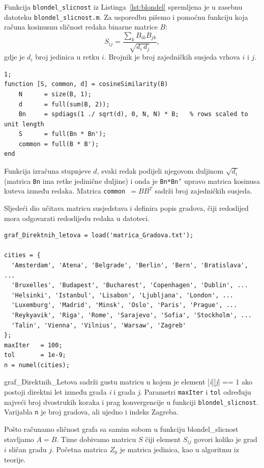 \documentclass[12pt, letterpaper]{article}
\numberwithin{figure}{section}
\begin{document}
Funkcija \texttt{blondel\_slicnost} iz Listinga~\ref{lst:blondel} spremljena je u zasebnu datoteku \texttt{blondel\_slicnost.m}. Za usporedbu pišemo i pomoćnu funkciju koja računa kosinusnu sličnost redaka binarne matrice $B$:
\[
S_{ij} = \frac{\sum_k B_{ik}B_{jk}}{\sqrt{d_i\, d_j}},
\]
gdje je $d_i$ broj jedinica u retku $i$. Brojnik je broj zajedničkih susjeda vrhova $i$ i $j$.

\begin{lstlisting}[style=octave, caption={Pomoćna funkcija za kosinusnu sličnost}, label={lst:cos_gradovi}]
1;
function [S, common, d] = cosineSimilarity(B)
    N      = size(B, 1);
    d      = full(sum(B, 2));
    Bn     = spdiags(1 ./ sqrt(d), 0, N, N) * B;   % rows scaled to unit length
    S      = full(Bn * Bn');
    common = full(B * B');
end
\end{lstlisting}
Funkcija izračuna stupnjeve $d$, svaki redak podijeli njegovom duljinom $\sqrt{d_i}$ (matrica \texttt{Bn} ima retke jedinične duljine) i onda je \texttt{Bn*Bn'} upravo matrica kosinusa kuteva između redaka. Matrica \texttt{common} \,$= BB^T$ sadrži broj zajedničkih susjeda.

Sljedeći dio učitava matricu susjedstava i definira popis gradova, čiji redoslijed mora odgovarati redoslijedu redaka u datoteci.

\begin{lstlisting}[style=octave, caption={Učitavanje grafa direktnih letova}, label={lst:gradovi_ucitavanje}]
graf_Direktnih_letova = load('matrica_Gradova.txt');

cities = {
  'Amsterdam', 'Atena', 'Belgrade', 'Berlin', 'Bern', 'Bratislava', ...
  'Bruxelles', 'Budapest', 'Bucharest', 'Copenhagen', 'Dublin', ...
  'Helsinki', 'Istanbul', 'Lisabon', 'Ljubljana', 'London', ...
  'Luxemburg', 'Madrid', 'Minsk', 'Oslo', 'Paris', 'Prague', ...
  'Reykyavik', 'Riga', 'Rome', 'Sarajevo', 'Sofia', 'Stockholm', ...
  'Talin', 'Vienna', 'Vilnius', 'Warsaw', 'Zagreb'
};
maxIter   = 100;
tol       = 1e-9;
n = numel(cities);
\end{lstlisting}
graf\_Direktnih\_Letova sadrži gustu matricu u kojem je element [\textit{i}][\textit{j}] == 1 ako postoji direktni let između grada \textit{i} i grada \textit{j}. Parametri \texttt{maxIter} i \texttt{tol} određuju najveći broj dvostrukih koraka i prag konvergencije u funkciji \texttt{blondel\_slicnost}. Varijabla \texttt{n} je broj gradova, ali ujedno i indeks Zagreba.

Pošto računamo sličnost grafa sa samim sobom u funkciju blondel\_slicnost stavljamo $A=B$. Time dobivamo matricu $S$ čiji element $S_{ij}$ govori koliko je grad $i$ sličan gradu $j$. Početna matrica $Z_0$ je matrica jedinica, kao u algoritmu iz teorije.
\end{document}
